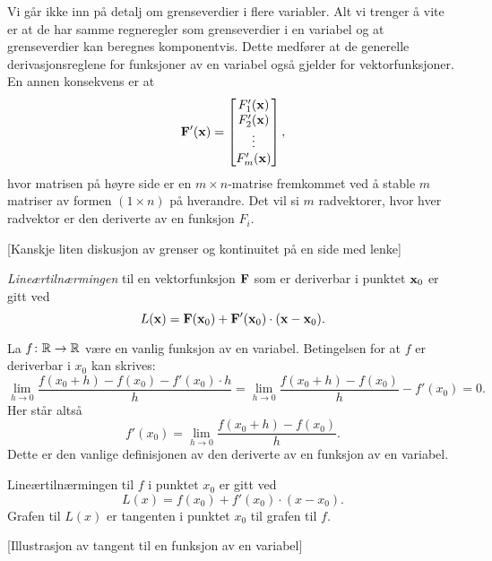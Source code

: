 Vi går ikke inn på detalj om grenseverdier i flere variabler. Alt vi trenger å
vite er at de har samme regneregler som
grenseverdier i en variabel og at grenseverdier kan beregnes komponentvis.
Dette medfører at de generelle derivasjonsreglene for funksjoner av en variabel også gjelder for vektorfunksjoner.
En annen konsekvens er at 
$$\mathbf{F}'(\mathbf{x}) = \begin{bmatrix} F'_1(\mathbf{x}) \\ F'_2(\mathbf{x})
\\ \vdots \\ F'_m(\mathbf{x}) \end{bmatrix},$$
hvor matrisen på høyre side er en $m \times n$-matrise fremkommet ved å stable
$m$ matriser av formen $(1 \times n)$ på hverandre.
Det vil si $m$ radvektorer, hvor hver radvektor er den deriverte av en funksjon $F_i$.

[Kanskje liten diskusjon av grenser og kontinuitet på en side med lenke]

\begin{definisjon}
  {\em Lineærtilnærmingen} til en vektorfunksjon $\mathbf{F}$ som er deriverbar i punktet $\mathbf{x}_0$ er
  gitt ved
  $$L(\mathbf{x}) = \mathbf{F}(\mathbf{x}_0) + \mathbf{F}'(\mathbf{x}_0) \cdot (\mathbf{x} - \mathbf{x}_0).$$
\end{definisjon}

\begin{eksempel}
  La $f \colon \mathbb{R} \to \mathbb{R}$ være en vanlig funksjon av en variabel. Betingelsen
  for at $f$ er deriverbar i $x_0$ kan skrives:
  $$\lim_{h\to 0} \frac{f(x_0+h) - f(x_0) - f'(x_0) \cdot h}{h} =
  \lim_{h\to 0} \frac{f(x_0+h) - f(x_0)}{h} - f'(x_0) = 0.$$
  Her står altså 
  $$f'(x_0) = \lim_{h\to 0} \frac{f(x_0+h) - f(x_0)}{h}.$$
  Dette er den vanlige definisjonen av den deriverte av en funksjon av en variabel.

  Lineærtilnærmingen til $f$ i punktet $x_0$ er gitt ved
  $$L(x) = f(x_0) + f'(x_0) \cdot (x - x_0).$$
  Grafen til $L(x)$ er tangenten i punktet $x_0$ til grafen til $f$.
\end{eksempel}
[Illustrasjon av tangent til en funksjon av en variabel]

